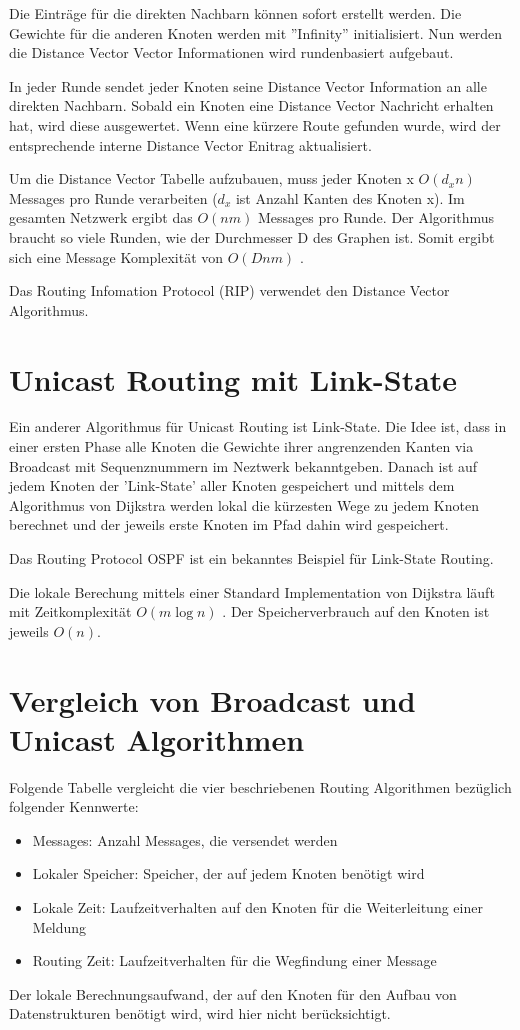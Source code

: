 Die Einträge für die direkten Nachbarn können sofort erstellt werden. Die Gewichte für die anderen Knoten werden mit ''Infinity'' initialisiert.
Nun werden die Distance Vector Vector Informationen wird rundenbasiert aufgebaut.

In jeder Runde sendet jeder Knoten seine Distance Vector Information an alle direkten Nachbarn.
Sobald ein Knoten eine Distance Vector Nachricht erhalten hat, wird diese ausgewertet. Wenn eine kürzere Route gefunden wurde, wird der entsprechende interne Distance Vector Enitrag aktualisiert.

Um die Distance Vector Tabelle aufzubauen, muss jeder Knoten x $O(d_xn)$ Messages pro Runde verarbeiten ($d_x$ ist Anzahl Kanten des Knoten x). Im gesamten Netzwerk ergibt das $O(nm)$ Messages pro Runde. Der Algorithmus braucht so viele Runden, wie der Durchmesser D des Graphen ist. Somit ergibt sich eine Message Komplexität von $O(Dnm)$ \cite{goodrich2006algorithm}.

Das Routing Infomation Protocol (RIP) \cite{hedrick1988routing} verwendet den Distance Vector Algorithmus.


\section{Unicast Routing mit Link-State}
Ein anderer Algorithmus für Unicast Routing ist Link-State. Die Idee ist, dass in einer ersten Phase alle Knoten die Gewichte ihrer angrenzenden Kanten via Broadcast mit Sequenznummern im Neztwerk bekanntgeben. Danach ist auf jedem Knoten der 'Link-State' aller Knoten gespeichert und mittels dem Algorithmus von Dijkstra werden lokal die kürzesten Wege zu jedem Knoten berechnet und der jeweils erste Knoten im Pfad dahin wird gespeichert.

Das Routing Protocol OSPF \cite{moy1998rfc} ist ein bekanntes Beispiel für Link-State Routing.

Die lokale Berechung mittels einer Standard Implementation von Dijkstra läuft mit Zeitkomplexität $O(m\log{}n)$ \cite{wiki:dijkstra}. Der Speicherverbrauch auf den Knoten ist jeweils $O(n)$.

\newpage

\section{Vergleich von Broadcast und Unicast Algorithmen}

Folgende Tabelle vergleicht die vier beschriebenen Routing Algorithmen bezüglich folgender Kennwerte:
\begin{itemize}
	\item Messages: 		Anzahl Messages, die versendet werden
    \item Lokaler Speicher: Speicher, der auf jedem Knoten benötigt wird
    \item Lokale Zeit: 		Laufzeitverhalten auf den Knoten für die Weiterleitung einer Meldung
    \item Routing Zeit: 	Laufzeitverhalten für die Wegfindung einer Message
\end{itemize}
Der lokale Berechnungsaufwand, der auf den Knoten für den Aufbau von Datenstrukturen benötigt wird, wird hier nicht berücksichtigt. 

